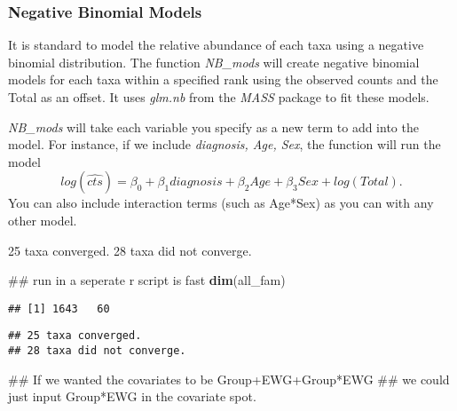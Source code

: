 \documentclass[]{article}
\newenvironment{Shaded}{\begin{snugshade}}{\end{snugshade}}
\newcommand{\KeywordTok}[1]{\textcolor[rgb]{0.13,0.29,0.53}{\textbf{#1}}}
\newcommand{\DataTypeTok}[1]{\textcolor[rgb]{0.13,0.29,0.53}{#1}}
\newcommand{\StringTok}[1]{\textcolor[rgb]{0.31,0.60,0.02}{#1}}
\newcommand{\OperatorTok}[1]{\textcolor[rgb]{0.81,0.36,0.00}{\textbf{#1}}}
\newcommand{\NormalTok}[1]{#1}
\begin{document}
\subsubsection{Negative Binomial Models}\label{negative-binomial-models}

It is standard to model the relative abundance of each taxa using a
negative binomial distribution. The function \emph{NB\_mods} will create
negative binomial models for each taxa within a specified rank using the
observed counts and the Total as an offset. It uses \emph{glm.nb} from
the \emph{MASS} package to fit these models.

\emph{NB\_mods} will take each variable you specify as a new term to add
into the model. For instance, if we include \emph{diagnosis, Age, Sex},
the function will run the model
\[log(\hat{cts}) = \beta_0  + \beta_1 diagnosis + \beta_2 Age + \beta_3 Sex + log(Total).\]
You can also include interaction terms (such as Age*Sex) as you can with
any other model.

25 taxa converged. 28 taxa did not converge.

\begin{Shaded}
\begin{Highlighting}[]
\NormalTok{## run in a seperate r script is fast  }
\KeywordTok{dim}\NormalTok{(all_fam)}
\end{Highlighting}
\end{Shaded}

\begin{verbatim}
## [1] 1643   60
\end{verbatim}

\begin{Shaded}
\end{Shaded}

\begin{verbatim}
## 25 taxa converged.
## 28 taxa did not converge.
\end{verbatim}

\begin{Shaded}
\begin{Highlighting}[]
\NormalTok{                           ## If we wanted the covariates to be Group+EWG+Group*EWG}
\NormalTok{                           ## we could just input Group*EWG in the covariate spot.}
\end{Highlighting}
\end{Shaded}
\end{document}
